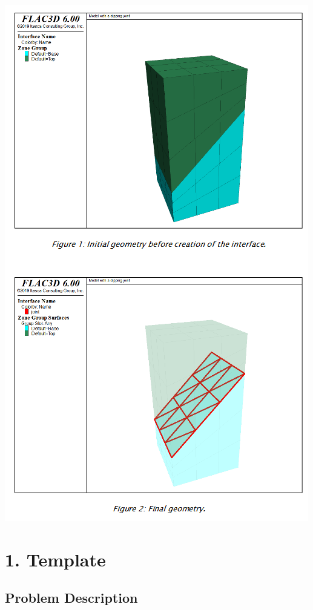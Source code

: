 \documentclass[a4paper, nobind]{templates/ociamthesis}
\begin{document}
\includegraphics[width=1\linewidth]{myfigureeeeee/interface-theory}

\startappendices

\hypertarget{template}{%
\chapter{1. Template}\label{template}}

\hypertarget{problem-description-2}{%
\section{Problem Description}\label{problem-description-2}}
\end{document}
